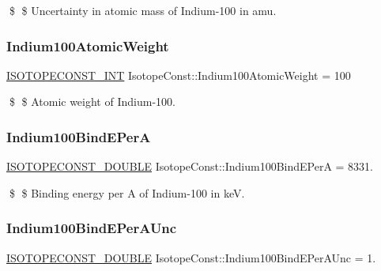 \$ \$ Uncertainty in atomic mass of Indium-\/100 in amu. \mbox{\label{group___isotope_const-_indium-_in100_gaca6fa61b2534d783586ec0916de1a2db}} 
\subsubsection{\texorpdfstring{Indium100\+Atomic\+Weight}{Indium100AtomicWeight}}
{\footnotesize\ttfamily \mbox{\hyperlink{group___isotope_const-_macros_ga5f18360b3e99483a35c32d789e62621c}{I\+S\+O\+T\+O\+P\+E\+C\+O\+N\+S\+T\+\_\+\+I\+NT}} Isotope\+Const\+::\+Indium100\+Atomic\+Weight = 100}

\$ \$ Atomic weight of Indium-\/100. \mbox{\label{group___isotope_const-_indium-_in100_ga917226ad080249fc497beea8b777f0a8}} 
\subsubsection{\texorpdfstring{Indium100\+Bind\+E\+PerA}{Indium100BindEPerA}}
{\footnotesize\ttfamily \mbox{\hyperlink{group___isotope_const-_macros_ga8f45a7272ce02c0b4c65c44636ed719a}{I\+S\+O\+T\+O\+P\+E\+C\+O\+N\+S\+T\+\_\+\+D\+O\+U\+B\+LE}} Isotope\+Const\+::\+Indium100\+Bind\+E\+PerA = 8331.}

\$ \$ Binding energy per A of Indium-\/100 in keV. \mbox{\label{group___isotope_const-_indium-_in100_gad857a875417b0ae2a0e69530f0f98c64}} 
\subsubsection{\texorpdfstring{Indium100\+Bind\+E\+Per\+A\+Unc}{Indium100BindEPerAUnc}}
{\footnotesize\ttfamily \mbox{\hyperlink{group___isotope_const-_macros_ga8f45a7272ce02c0b4c65c44636ed719a}{I\+S\+O\+T\+O\+P\+E\+C\+O\+N\+S\+T\+\_\+\+D\+O\+U\+B\+LE}} Isotope\+Const\+::\+Indium100\+Bind\+E\+Per\+A\+Unc = 1.}

